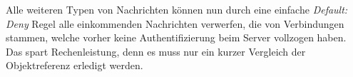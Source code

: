 Alle weiteren Typen von Nachrichten können nun durch eine einfache \emph{Default: Deny} Regel alle einkommenden Nachrichten verwerfen, die von Verbindungen stammen, welche vorher keine Authentifizierung beim Server vollzogen haben. Das spart Rechenleistung, denn es muss nur ein kurzer Vergleich der Objektreferenz erledigt werden.



















